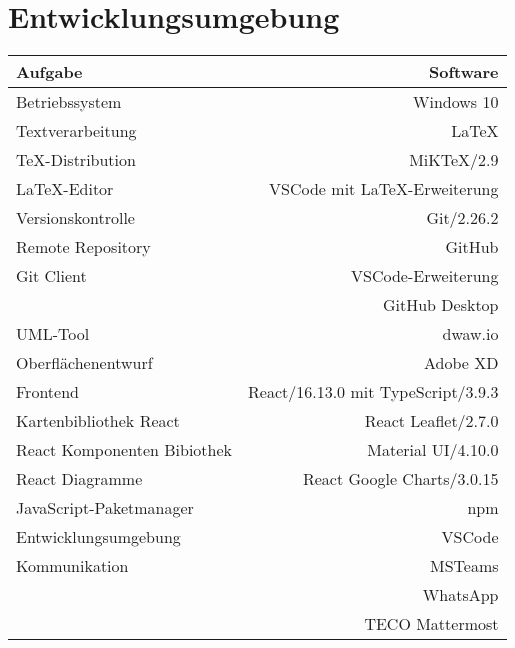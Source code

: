 \section{Entwicklungsumgebung}

\begin{tabular}[htb]{l|r}
    Aufgabe & Software\\
    \hline \hline
    Betriebssystem & Windows 10\\
    \hline
    Textverarbeitung & \LaTeX\\
    TeX-Distribution & MiKTeX/2.9\\
    \LaTeX -Editor & VSCode mit \LaTeX -Erweiterung\\
    \hline
    Versionskontrolle & Git/2.26.2\\
    Remote Repository & GitHub\\
    Git Client & VSCode-Erweiterung\\
    & GitHub Desktop\\
    UML-Tool & dwaw.io\\
    Oberflächenentwurf & Adobe XD\\
    \hline
    Frontend & React/16.13.0 mit TypeScript/3.9.3\\
    Kartenbibliothek React & React Leaflet/2.7.0\\
    React Komponenten Bibiothek & Material UI/4.10.0\\
    React Diagramme & React Google Charts/3.0.15\\
    JavaScript-Paketmanager & npm\\
    Entwicklungsumgebung & VSCode\\
    \hline
    Kommunikation & MSTeams\\
    & WhatsApp\\
    & TECO Mattermost\\
\end{tabular}    
